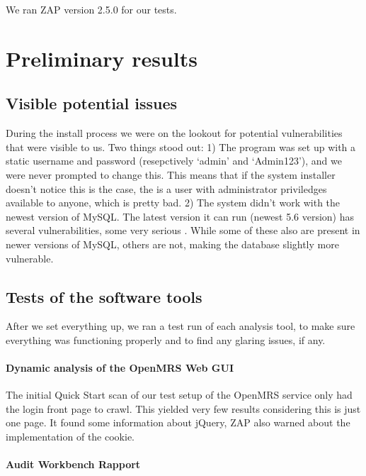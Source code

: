 \documentclass{article}
\begin{document}

We ran ZAP version 2.5.0 for our tests.

\section{Preliminary results}

\subsection{Visible potential issues}
  During the install process we were on the lookout for potential vulnerabilities that
  were visible to us. Two things stood out:
  1) The program was set up with a static username and password (resepctively `admin'
  and `Admin123'), and we were never prompted to change this. This means that if the system
  installer doesn't notice this is the case, the is a user with administrator priviledges
  available to anyone, which is pretty bad.
  2) The system didn't work with the newest version of MySQL. The latest version it can run (newest 5.6 version)
  has several vulnerabilities, some very serious \autocite[]{CVEDetails}. While some of these
  also are present in newer versions of MySQL, others are not, making the database slightly more vulnerable.

\subsection{Tests of the software tools}

  After we set everything up, we ran a test run of each analysis tool, to make sure
  everything was functioning properly and to find any glaring issues, if any.

\paragraph{Dynamic analysis of the OpenMRS Web GUI}
  
  The initial Quick Start scan of our test setup of the OpenMRS service only had
  the login front page to crawl. This yielded very few results considering this
  is just one page. It found some information about jQuery, ZAP also warned
  about the implementation of the cookie.

  
\paragraph{Audit Workbench Rapport}  
\end{document}
